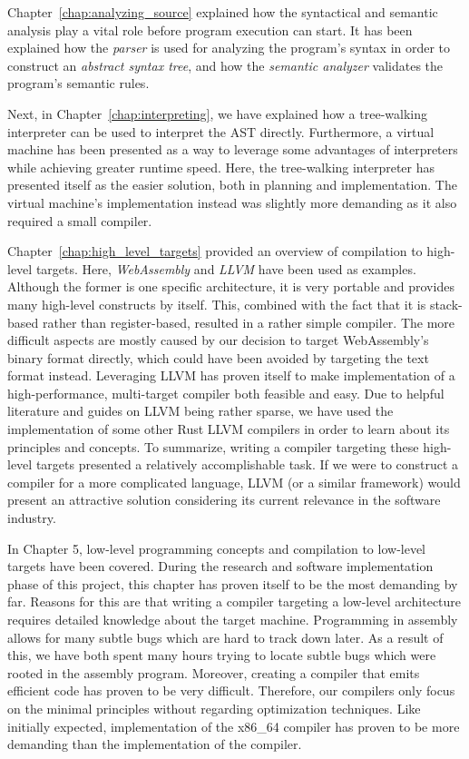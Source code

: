 Chapter~\ref{chap:analyzing_source} explained how the syntactical and semantic analysis play a vital role before program execution can start.
It has been explained how the \emph{parser} is used for analyzing the program's syntax in order to construct an \emph{abstract syntax tree},
and how the \emph{semantic analyzer} validates the program's semantic rules.

Next, in Chapter~\ref{chap:interpreting}, we have explained how a tree-walking interpreter can be used to interpret the AST directly.
Furthermore, a virtual machine has been presented as a way to leverage some advantages of interpreters while
achieving greater runtime speed.
Here, the tree-walking interpreter has presented itself as the easier solution, both in planning and implementation.
The virtual machine's implementation instead was slightly more demanding as it also required a small compiler.

Chapter~\ref{chap:high_level_targets} provided an overview of compilation to high-level targets.
Here, \emph{WebAssembly} and \emph{LLVM} have been used as examples.
Although the former is one specific architecture, it is very portable and provides many high-level constructs by itself.
This, combined with the fact that it is stack-based rather than register-based, resulted in a rather simple compiler.
The more difficult aspects are mostly caused by our decision to target WebAssembly's binary format directly, which could have been avoided by targeting the text format instead.
Leveraging LLVM has proven itself to make implementation of a high-performance, multi-target compiler both feasible and easy.
Due to helpful literature and guides on LLVM being rather sparse, we have used the implementation of some other Rust LLVM compilers
in order to learn about its principles and concepts.
To summarize, writing a compiler targeting these high-level targets presented a relatively accomplishable task.
If we were to construct a compiler for a more complicated language, LLVM (or a similar framework) would present an attractive solution considering its current relevance in the software industry.

In Chapter 5, low-level programming concepts and compilation to low-level targets have been covered.
During the research and software implementation phase of this project,
this chapter has proven itself to be the most demanding by far.
Reasons for this are that writing a compiler targeting a low-level architecture
requires detailed knowledge about the target machine.
Programming in assembly allows for many subtle bugs which are hard to track down later.
As a result of this, we have both spent many hours trying to locate subtle bugs which were rooted in the assembly program.
Moreover, creating a compiler that emits efficient code has proven to be very difficult.
Therefore, our compilers only focus on the minimal principles without regarding optimization techniques.
Like initially expected, implementation of the x86\_64 compiler has proven to be more demanding than the implementation of the \riscv{} compiler.

